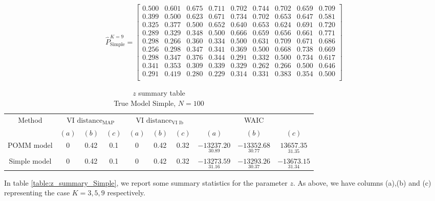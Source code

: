 \documentclass[11pt]{amsart}
\begin{document}
\[ 
\hat{P}^{K=9}_{\text{Simple}} = 
\left[\begin{array}{ccccccccc}
0.500 & 0.601 & 0.675 & 0.711 & 0.702 & 0.744 & 0.702 & 0.659 & 0.709 \\
0.399 & 0.500 & 0.623 & 0.671 & 0.734 & 0.702 & 0.653 & 0.647 & 0.581 \\
0.325 & 0.377 & 0.500 & 0.652 & 0.640 & 0.653 & 0.624 & 0.691 & 0.720 \\
0.289 & 0.329 & 0.348 & 0.500 & 0.666 & 0.659 & 0.656 & 0.661 & 0.771 \\
0.298 & 0.266 & 0.360 & 0.334 & 0.500 & 0.631 & 0.709 & 0.671 & 0.686 \\
0.256 & 0.298 & 0.347 & 0.341 & 0.369 & 0.500 & 0.668 & 0.738 & 0.669 \\
0.298 & 0.347 & 0.376 & 0.344 & 0.291 & 0.332 & 0.500 & 0.734 & 0.617 \\
0.341 & 0.353 & 0.309 & 0.339 & 0.329 & 0.262 & 0.266 & 0.500 & 0.646 \\
0.291 & 0.419 & 0.280 & 0.229 & 0.314 & 0.331 & 0.383 & 0.354 & 0.500 \\\end{array}\right]
\]


\begin{table}[htbp]
\centering
\caption{
{\large $z$ summary table} \\ 
{\small True Model Simple, $N=100$}
} 
\begin{tabular}{cccccccccc}
\toprule
\multirow{2}{*}{Method} & \multicolumn{3}{c}{
VI $\text{distance}_{\text{MAP}}$} & \multicolumn{3}{c}{
VI $\text{distance}_{\text{VI lb}}$} & \multicolumn{3}{c}{WAIC} \\
\cmidrule(lr){2-4} \cmidrule(lr){5-7} \cmidrule(lr){8-10}
& $(a)$ & $(b)$ & $(c)$ & $(a)$ & $(b)$ & $(c)$ & $(a)$ & $(b)$ & $(c)$ \\
\midrule
POMM model  &0 & 0.42 & 0.1 & 0 & 0.42 & 0.32   & $\underset{30.89}{-13237.20}$ & $\underset{30.77}{-13352.68}$ & $\underset{31.35}{13657.35}$  \\
Simple model &0 & 0.42 & 0.1 & 0 & 0.42 & 0.32  & $\underset{31.16}{-13273.59}$ & $\underset{ 30.37}{-13293.26}$ & $\underset{31.34}{-13673.15}$ \\
\bottomrule
\end{tabular}
\label{table:z_summary_Simple}
\end{table}

In table \eqref{table:z_summary_Simple}, we report some summary statistics for the parameter $z$. As above, we have columns (a),(b) and (c) representing the case $K=3,5,9$ respectively.
\end{document}
